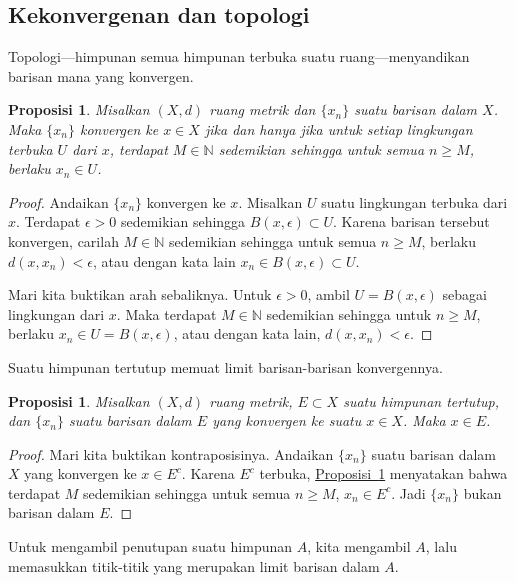 \documentclass[12pt,openany]{book}
\newcommand{\N}{{\mathbb{N}}}
\theoremstyle{plain}
\newtheorem{prop}[thm]{Proposisi}
\theoremstyle{remark}
\theoremstyle{definition}
\theoremstyle{exercise}
\theoremstyle{example}
\newcommand{\propref}[1]{\hyperref[#1]{Proposisi~\ref*{#1}}}
\begin{document}
\subsection{Kekonvergenan dan topologi}

Topologi---himpunan semua himpunan terbuka suatu ruang---menyandikan barisan mana yang
konvergen.

\begin{prop} \label{prop:msconvtopo}
Misalkan $(X,d)$ ruang metrik dan $\{x_n\}$ suatu barisan dalam $X$. Maka
$\{ x_n \}$ konvergen ke $x \in X$ jika dan hanya jika untuk setiap lingkungan terbuka
$U$ dari $x$, terdapat $M \in \N$ sedemikian sehingga untuk semua $n \geq M$,
berlaku $x_n \in U$.
\end{prop}

\begin{proof}
Andaikan $\{ x_n \}$ konvergen ke $x$. Misalkan $U$ suatu lingkungan terbuka
dari $x$. Terdapat $\epsilon > 0$ sedemikian sehingga $B(x,\epsilon) \subset
U$. Karena barisan tersebut konvergen, carilah $M \in \N$ sedemikian sehingga untuk semua $n \geq
M$, berlaku $d(x,x_n) < \epsilon$, atau dengan kata lain $x_n \in B(x,\epsilon)
\subset U$.

Mari kita buktikan arah sebaliknya. Untuk $\epsilon > 0$, ambil $U =
B(x,\epsilon)$ sebagai lingkungan dari $x$. Maka terdapat $M \in \N$
sedemikian sehingga untuk $n \geq M$, berlaku $x_n \in U = B(x,\epsilon)$, atau dengan kata
lain, $d(x,x_n) < \epsilon$.
\end{proof}

Suatu himpunan tertutup memuat limit barisan-barisan konvergennya.

\begin{prop} \label{prop:msclosedlim}
Misalkan $(X,d)$ ruang metrik, $E \subset X$ suatu himpunan tertutup,
dan $\{ x_n \}$ suatu barisan dalam $E$ yang konvergen ke suatu $x \in X$.
Maka $x \in E$.
\end{prop}

\begin{proof}
Mari kita buktikan kontraposisinya.
Andaikan $\{ x_n \}$ suatu barisan dalam $X$ yang konvergen ke $x \in E^c$.
Karena $E^c$ terbuka, \propref{prop:msconvtopo} menyatakan bahwa terdapat
$M$ sedemikian sehingga untuk semua $n \geq M$,
$x_n \in E^c$. Jadi $\{ x_n \}$ bukan barisan dalam $E$.
\end{proof}

Untuk mengambil penutupan suatu himpunan $A$, kita mengambil $A$, lalu memasukkan
titik-titik yang merupakan limit barisan dalam $A$.
\end{document}
